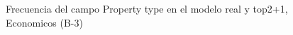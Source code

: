 \begin{figure}[H]
    \centering
    
    \caption{Frecuencia del campo Property type en el modelo real y top2+1, Economicos (B-3)}
    \label{frecuency-Property Type-top2+1}
\end{figure}